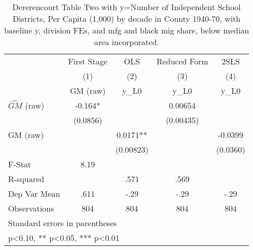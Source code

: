 \begin{table}[htbp]\centering
\def\sym#1{\ifmmode^{#1}\else\(^{#1}\)\fi}
\caption{Dererencourt Table Two with y=Number of Independent School Districts, Per Capita (1,000) by decade in County 1940-70, with baseline y, division FEs, and mfg and black mig share, below median area incorporated.}
\begin{tabular}{l*{4}{c}}
\toprule
                    & First Stage   &         OLS   &Reduced Form   &        2SLS   \\
                    &\multicolumn{1}{c}{(1)}&\multicolumn{1}{c}{(2)}&\multicolumn{1}{c}{(3)}&\multicolumn{1}{c}{(4)}\\
                    &\multicolumn{1}{c}{GM  (raw)}&\multicolumn{1}{c}{y\_L0}&\multicolumn{1}{c}{y\_L0}&\multicolumn{1}{c}{y\_L0}\\
\midrule
$\hat{GM}$ (raw)    &      -0.164*  &               &     0.00654   &               \\
                    &    (0.0856)   &               &   (0.00435)   &               \\
\addlinespace
GM  (raw)           &               &      0.0171** &               &     -0.0399   \\
                    &               &   (0.00823)   &               &    (0.0360)   \\
\midrule
F-Stat              &        8.19   &               &               &               \\
R-squared           &               &        .571   &        .569   &               \\
Dep Var Mean        &        .611   &        -.29   &        -.29   &        -.29   \\
Observations        &         804   &         804   &         804   &         804   \\
\bottomrule
\multicolumn{5}{l}{\footnotesize Standard errors in parentheses}\\
\multicolumn{5}{l}{\footnotesize * p<0.10, ** p<0.05, *** p<0.01}\\
\end{tabular}
\end{table}

